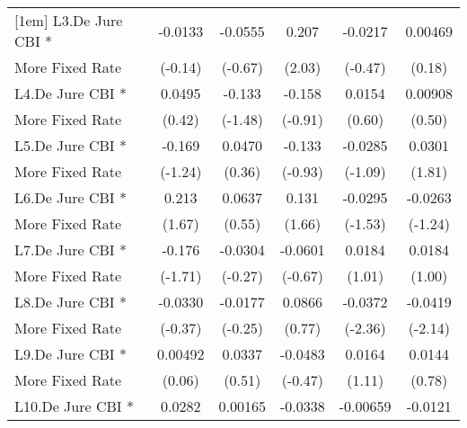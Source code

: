 {\begin{tabular}{l*{5}{c}}
[1em]
L3.De Jure CBI *    &     -0.0133         &     -0.0555         &       0.207\sym{*}  &     -0.0217         &     0.00469         \\
More Fixed Rate     &     (-0.14)         &     (-0.67)         &      (2.03)         &     (-0.47)         &      (0.18)         \\
[1em]
L4.De Jure CBI *    &      0.0495         &      -0.133         &      -0.158         &      0.0154         &     0.00908         \\
More Fixed Rate     &      (0.42)         &     (-1.48)         &     (-0.91)         &      (0.60)         &      (0.50)         \\
[1em]
L5.De Jure CBI *    &      -0.169         &      0.0470         &      -0.133         &     -0.0285         &      0.0301         \\
More Fixed Rate     &     (-1.24)         &      (0.36)         &     (-0.93)         &     (-1.09)         &      (1.81)         \\
[1em]
L6.De Jure CBI *    &       0.213         &      0.0637         &       0.131         &     -0.0295         &     -0.0263         \\
More Fixed Rate     &      (1.67)         &      (0.55)         &      (1.66)         &     (-1.53)         &     (-1.24)         \\
[1em]
L7.De Jure CBI *    &      -0.176         &     -0.0304         &     -0.0601         &      0.0184         &      0.0184         \\
More Fixed Rate     &     (-1.71)         &     (-0.27)         &     (-0.67)         &      (1.01)         &      (1.00)         \\
[1em]
L8.De Jure CBI *    &     -0.0330         &     -0.0177         &      0.0866         &     -0.0372\sym{*}  &     -0.0419\sym{*}  \\
More Fixed Rate     &     (-0.37)         &     (-0.25)         &      (0.77)         &     (-2.36)         &     (-2.14)         \\
[1em]
L9.De Jure CBI *    &     0.00492         &      0.0337         &     -0.0483         &      0.0164         &      0.0144         \\
More Fixed Rate     &      (0.06)         &      (0.51)         &     (-0.47)         &      (1.11)         &      (0.78)         \\
[1em]
L10.De Jure CBI *   &      0.0282         &     0.00165         &     -0.0338         &    -0.00659         &     -0.0121         \\

\end{tabular}}
